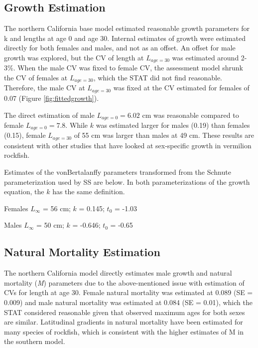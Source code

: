 \documentclass[
  english,
  a4paper,
]{article}
\begin{document}
\hypertarget{growth-estimation}{%
\subsection{Growth Estimation}\label{growth-estimation}}

The northern California base model estimated reasonable growth parameters for k and lengths at age 0 and age 30. Internal estimates of growth were estimated directly for both females and males, and not as an offset. An offset for male growth was explored, but the CV of length at \(L_{age=30}\) was estimated around 2-3\%. When the male CV was fixed to female CV, the assessment model shrunk the CV of females at \(L_{age=30}\), which the STAT did not find reasonable. Therefore, the male CV at \(L_{age=30}\) was fixed at the CV estimated for females of 0.07 (Figure \ref{fig:fittedgrowth}).

The direct estimation of male \(L_{age=0}=6.02\) cm was reasonable compared to female \(L_{age=0}=7.8\). While \(k\) was estimated larger for males (0.19) than females (0.15), female \(L_{age=30}\) of 55 cm was larger than males at 49 cm. These results are consistent with other studies that have looked at sex-specific growth in vermilion rockfish.

Estimates of the vonBertalanffy parameters transformed from the Schnute parameterization used by SS are below. In both parameterizations of the growth equation, the \(k\) has the same definition.

\begin{centering}

Females $L_{\infty}$ = 56 cm; $k$ = 0.145; $t_0$ = -1.03

Males $L_{\infty}$ = 50 cm; $k$ = -0.646; $t_0$ = -0.65

\end{centering}

\vspace{0.5cm}

\hypertarget{natural-mortality-estimation}{%
\subsection{Natural Mortality Estimation}\label{natural-mortality-estimation}}

The northern California model directly estimates male growth and natural mortality (\emph{M}) parameters due to the above-mentioned issue with estimation of CVs for length at age 30. Female natural mortality was estimated at 0.089 (SE = 0.009) and male natural mortality was estimated at 0.084 (SE = 0.01), which the STAT considered reasonable given that observed maximum ages for both sexes are similar. Latitudinal gradients in natural mortality have been estimated for many species of rockfish, which is consistent with the higher estimates of M in the southern model.
\end{document}
